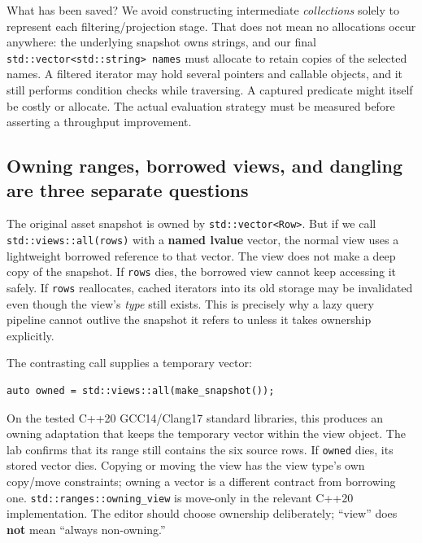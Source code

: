 What has been saved? We avoid constructing intermediate \emph{collections} solely to represent each filtering/projection stage. That does not mean no allocations occur anywhere: the underlying snapshot owns strings, and our final \texttt{std::vector\textless{}std::string\textgreater{}\ names} must allocate to retain copies of the selected names. A filtered iterator may hold several pointers and callable objects, and it still performs condition checks while traversing. A captured predicate might itself be costly or allocate. The actual evaluation strategy must be measured before asserting a throughput improvement.

\subsection{Owning ranges, borrowed views, and dangling are three separate questions}\label{05-engine-i-ch006-owning-ranges-borrowed-views-and-dangling-are-three-separate-questions}

The original asset snapshot is owned by \texttt{std::vector\textless{}Row\textgreater{}}. But if we call \texttt{std::views::all(rows)} with a \textbf{named lvalue} vector, the normal view uses a lightweight borrowed reference to that vector. The view does not make a deep copy of the snapshot. If \texttt{rows} dies, the borrowed view cannot keep accessing it safely. If \texttt{rows} reallocates, cached iterators into its old storage may be invalidated even though the view's \emph{type} still exists. This is precisely why a lazy query pipeline cannot outlive the snapshot it refers to unless it takes ownership explicitly.

The contrasting call supplies a temporary vector:

\begin{verbatim}
auto owned = std::views::all(make_snapshot());
\end{verbatim}

On the tested C++20 GCC14/Clang17 standard libraries, this produces an owning adaptation that keeps the temporary vector within the view object. The lab confirms that its range still contains the six source rows. If \texttt{owned} dies, its stored vector dies. Copying or moving the view has the view type's own copy/move constraints; owning a vector is a different contract from borrowing one. \texttt{std::ranges::owning\_view} is move-only in the relevant C++20 implementation. The editor should choose ownership deliberately; ``view'' does \textbf{not} mean ``always non-owning.''

